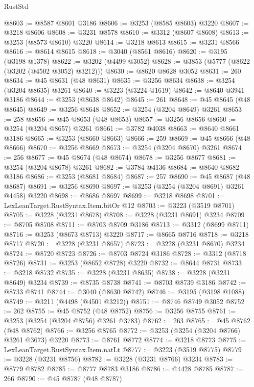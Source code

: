 \begin{lexlean}{RustStd}
\begin{coremodule}
{\begin{coremodule}
{{{{{{{{{{{{{{{{{{{{{{{{{{{{{{{{{{{{{@8603 := @8587 @8601 @3186
@8606 := @3253 (@8585 @8603) @3220
@8607 := @3218 @8606
@8608 := @3231 @8578
@8610 := @3312 (@8607 @8608)
@8613 := @3253 (@8573 @8610) @3220
@8614 := @3218 @8613
@8615 := @3231 @8566
@8616 := @8614 @8615
@8618 := @3040 (@8561 @8616)
@8620 := @3195 (@3198 @1378)
@8622 := @3202 (@4499 @3052)
@8628 := @3853 (@5777 (@8622 (@3202 (@4502 @3052) @3212)))
@8630 := @8620 @8628 @3052
@8631 := 260
@8634 := @45 @8631 (@48 @8631)
@8635 := @3256 @8634
@8638 := @3254 (@3204 @8635) @3261
@8640 := @3223 (@3224 @1619)
@8642 := @8640 @3941 @3186
@8644 := @3253 (@8638 @8642)
@8645 := 261
@8648 := @45 @8645 (@48 @8645)
@8649 := @3256 @8648
@8652 := @3254 (@3204 @8649) @3261
@8653 := 258
@8656 := @45 @8653 (@48 @8653)
@8657 := @3256 @8656
@8660 := @3254 (@3204 @8657) @3261
@8661 := @3782 @4038
@8663 := @8640 @8661 @3186
@8665 := @3253 (@8660 @8663)
@8666 := 259
@8669 := @45 @8666 (@48 @8666)
@8670 := @3256 @8669
@8673 := @3254 (@3204 @8670) @3261
@8674 := 256
@8677 := @45 @8674 (@48 @8674)
@8678 := @3256 @8677
@8681 := @3254 (@3204 @8678) @3261
@8682 := @3784 @4136
@8684 := @8640 @8682 @3186
@8686 := @3253 (@8681 @8684)
@8687 := 257
@8690 := @45 @8687 (@48 @8687)
@8691 := @3256 @8690
@8697 := @3253 (@3254 (@3204 @8691) @3261 @4458) @3220
@8698 := @8686 @8697
@8699 := @3218 @8698
@8701 := LexLeanTarget.RustSyntax.Item.bitOr @12
@8703 := @3223 (@3519 @8701)
@8705 := @3228 (@3231 @8678)
@8708 := @3228 (@3231 @8691) @3234
@8709 := @8705 @8708
@8711 := @8703 @8709 @3186
@8713 := @3312 (@8699 @8711)
@8716 := @3253 (@8673 @8713) @3220
@8717 := @8665 @8716
@8718 := @3218 @8717
@8720 := @3228 (@3231 @8657)
@8723 := @3228 (@3231 @8670) @3234
@8724 := @8720 @8723
@8726 := @8703 @8724 @3186
@8728 := @3312 (@8718 @8726)
@8731 := @3253 (@8652 @8728) @3220
@8732 := @8644 @8731
@8733 := @3218 @8732
@8735 := @3228 (@3231 @8635)
@8738 := @3228 (@3231 @8649) @3234
@8739 := @8735 @8738
@8741 := @8703 @8739 @3186
@8742 := @8733 @8741
@8744 := @3040 (@8630 @8742)
@8746 := @3195 (@3198 @1088)
@8749 := @3211 (@4498 (@4501 @3212))
@8751 := @8746 @8749 @3052
@8752 := 262
@8755 := @45 @8752 (@48 @8752)
@8756 := @3256 @8755
@8761 := @3253 (@3254 (@3204 @8756) @3261 @3783)
@8762 := 263
@8765 := @45 @8762 (@48 @8762)
@8766 := @3256 @8765
@8772 := @3253 (@3254 (@3204 @8766) @3261 @3673) @3220
@8773 := @8761 @8772
@8774 := @3218 @8773
@8775 := LexLeanTarget.RustSyntax.Item.natLt
@8777 := @3223 (@3519 @8775)
@8779 := @3228 (@3231 @8756)
@8782 := @3228 (@3231 @8766) @3234
@8783 := @8779 @8782
@8785 := @8777 @8783 @3186
@8786 := @4428 @8785
@8787 := 266
@8790 := @45 @8787 (@48 @8787)
}}}}}}}}}}}}}}}}}}}}}}}}}}}}}}}}}}}}}
\end{coremodule}}
\end{coremodule}
\end{lexlean}
